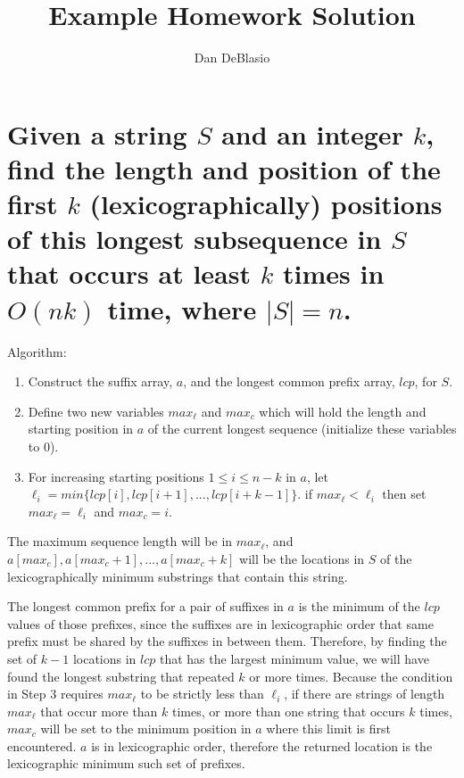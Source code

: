 \documentclass[11pt, oneside]{article}   	%
\title{Example Homework Solution}
\author{Dan DeBlasio}
\date{}							%
\begin{document}
\maketitle

\section{Given a string $S$ and an integer $k$, find the length and position of the first $k$ (lexicographically) positions of this longest subsequence in $S$ that occurs at least $k$ times in $O(nk)$ time, where $|S|=n$.}

Algorithm:
\begin{enumerate}
\item Construct the suffix array, $a$, and the longest common prefix array, $lcp$, for $S$. 
\item Define two new variables $max_\ell$ and $max_c$ which will hold the length and starting position in $a$ of the current longest sequence (initialize these variables to $0$).
\item For increasing starting positions $1 \le i \le n - k$ in $a$, let $\ell_i = min\{lcp[i],lcp[i+1],...,lcp[i+k-1]\}$. if $max_\ell < \ell_i$ then set $max_\ell = \ell_i$ and $max_c=i$.
\end{enumerate}
The maximum sequence length will be in $max_\ell$, and $a[max_c], a[max_c+1], ..., a[max_c+k]$ will be the locations in $S$ of the lexicographically minimum substrings that contain this string.

The longest common prefix for a pair of suffixes in $a$ is the minimum of the $lcp$ values of those prefixes, 
since the suffixes are in lexicographic order that same prefix must be shared by the suffixes in between them. 
Therefore, by finding the set of $k-1$ locations in $lcp$ that has the largest minimum value, we will have found the longest substring that repeated $k$ or more times.
Because the condition in Step 3 requires $max_\ell$ to be strictly less than $\ell_i$, if there are strings of length $max_\ell$ that occur more than $k$ times, or more than one string that occurs $k$ times, 
$max_c$ will be set to the minimum position in $a$ where this limit is first encountered. 
$a$ is in lexicographic order, therefore the returned location is the lexicographic minimum such set of prefixes. 
\end{document}
